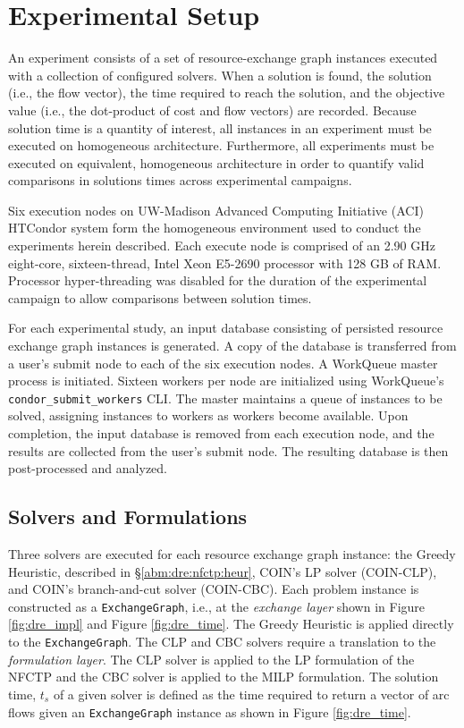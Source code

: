 
\section{Experimental Setup}\label{results:setup}

An experiment consists of a set of resource-exchange graph instances executed
with a collection of configured solvers. When a solution is found, the solution
(i.e., the flow vector), the time required to reach the solution, and the
objective value (i.e., the dot-product of cost and flow vectors) are
recorded. Because solution time is a quantity of interest, all instances in an
experiment must be executed on homogeneous architecture. Furthermore, all
experiments must be executed on equivalent, homogeneous architecture in order to
quantify valid comparisons in solutions times across experimental campaigns.

Six execution nodes on UW-Madison Advanced Computing Initiative (ACI) HTCondor
system form the homogeneous environment used to conduct the experiments herein
described. Each execute node is comprised of an 2.90 GHz eight-core,
sixteen-thread, Intel Xeon E5-2690 \cite{intelproc} processor with 128 GB of
RAM. Processor hyper-threading was disabled for the duration of the experimental
campaign to allow comparisons between solution times.

For each experimental study, an input database consisting of persisted resource
exchange graph instances is generated. A copy of the database is transferred
from a user's submit node to each of the six execution nodes. A WorkQueue master
process is initiated. Sixteen workers per node are initialized using WorkQueue's
\texttt{condor\_submit\_workers} CLI. The master maintains a queue of instances
to be solved, assigning instances to workers as workers become available. Upon
completion, the input database is removed from each execution node, and the
results are collected from the user's submit node. The resulting database is
then post-processed and analyzed.

\subsection{Solvers and Formulations}

Three solvers are executed for each resource exchange graph instance: the Greedy
Heuristic, described in \S \ref{abm:dre:nfctp:heur}, COIN's LP solver
(COIN-CLP), and COIN's branch-and-cut solver (COIN-CBC). Each problem instance
is constructed as a \texttt{ExchangeGraph}, i.e., at the \textit{exchange layer}
shown in Figure \ref{fig:dre_impl} and Figure \ref{fig:dre_time}. The Greedy
Heuristic is applied directly to the \texttt{ExchangeGraph}. The CLP and CBC
solvers require a translation to the \textit{formulation layer}. The CLP solver
is applied to the LP formulation of the NFCTP and the CBC solver is applied to
the MILP formulation. The solution time, $t_s$ of a given solver is defined as
the time required to return a vector of arc flows given an
\texttt{ExchangeGraph} instance as shown in Figure \ref{fig:dre_time}.

